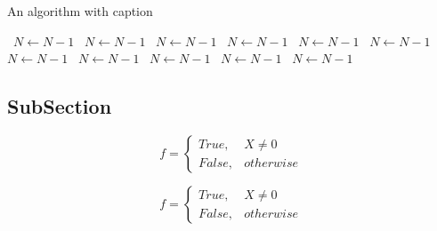 \documentclass[a4paper]{article}
\begin{document}
\begin{algorithm}
\caption{An algorithm with caption}
\begin{algorithmic}
\    \State $N \gets N - 1$
\    \State $N \gets N - 1$
\    \State $N \gets N - 1$
\    \State $N \gets N - 1$
\    \State $N \gets N - 1$
\    \State $N \gets N - 1$
\    \State $N \gets N - 1$
\    \State $N \gets N - 1$
\    \State $N \gets N - 1$
\    \State $N \gets N - 1$
\    \State $N \gets N - 1$
\EndWhile
\end{algorithmic}
\end{algorithm}

\subsection{SubSection}

\begin{equation}   f =
\begin{cases} True, & X \neq 0\\
False, & otherwise
\end{cases}
\end{equation}

\begin{equation}   f =
\begin{cases} True, & X \neq 0\\
False, & otherwise
\end{cases}
\end{equation}
\end{document}

